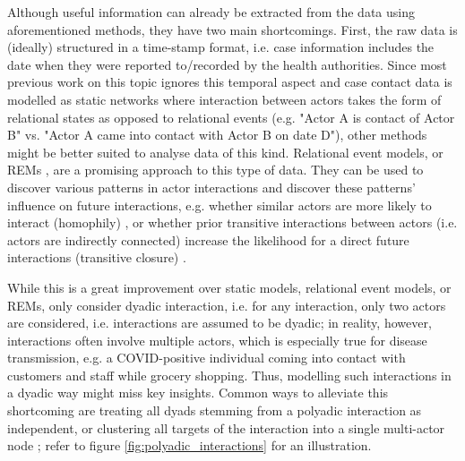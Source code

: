 \documentclass{article}
\begin{document}
	\noindent Although useful information can already be extracted from the data using aforementioned methods, they have two main shortcomings. First, the raw data is (ideally) structured in a time-stamp format, i.e. case information includes the date when they were reported to/recorded by the health authorities. Since most previous work on this topic ignores this temporal aspect and case contact data is modelled as static networks where interaction between actors takes the form of relational states as opposed to relational events (e.g. "Actor A is contact of Actor B" vs. "Actor A came into contact with Actor B on date D"), other methods might be better suited to analyse data of this kind. Relational event models, or REMs \cite{perry2013point,butts20084}, are a promising approach to this type of data. They can be used to discover various patterns in actor interactions and discover these patterns' influence on future interactions, e.g. whether similar actors are more likely to interact (homophily) \cite{butts20084,pilny_rem}, or whether prior transitive interactions between actors (i.e. actors are indirectly connected) increase the likelihood for a direct future interactions (transitive closure) \cite{butts20084}.
	
	While this is a great improvement over static models, relational event models, or REMs, only consider dyadic interaction, i.e. for any interaction, only two actors are considered, i.e. interactions are assumed to be dyadic; in reality, however, interactions often involve multiple actors, which is especially true for disease transmission, e.g. a COVID-positive individual coming into contact with customers and staff while grocery shopping. Thus, modelling such interactions in a dyadic way might miss key insights. Common ways to alleviate this shortcoming are treating all dyads stemming from a polyadic interaction as independent, or clustering all targets of the interaction into a single multi-actor node \cite{butts20084,perry2013point}; refer to figure \ref{fig:polyadic_interactions} for an illustration.
	
\end{document}
